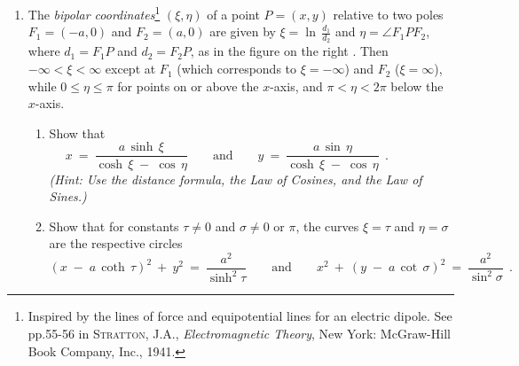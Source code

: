 {\begin{enumerate}[\bfseries 1.]
\[\]
[{[\bfseries 1.]}]
 \item The \emph{bipolar coordinates}\footnote{Inspired by the lines of force
  and equipotential lines for an electric dipole. See pp.55-56 in
 \textsc{Stratton, J.A.}, \emph{Electromagnetic Theory}, New York: McGraw-Hill
 Book Company, Inc., 1941.} $(\xi,\eta)$ of a point $P=(x,y)$ relative to
 two poles $F_1=(-a,0)$ and $F_2=(a,0)$ are given by
 $\xi = \ln\,\frac{d_1}{d_2}$ and $\eta =\angle F_1PF_2$, where $d_1=F_1P$ and
 $d_2=F_2P$, as in the figure on the right . Then
 $-\infty < \xi < \infty$ except at $F_1$ (which corresponds to
 $\xi=-\infty$) and $F_2$ ($\xi=\infty$), while $0 \le \eta \le \pi$ for points
 on or above the $x$-axis, and $\pi < \eta < 2\pi$ below the  $x$-axis.
\begin{enumerate}[\bfseries (a)]
 \item Show that
\[
x ~=~ \frac{a\,\sinh\,\xi}{\cosh\,\xi \;-\; \cos\,\eta} \qquad\text{and}\qquad
y ~=~ \frac{a\,\sin\,\eta}{\cosh\,\xi \;-\; \cos\,\eta} ~~.\qquad\qquad
\]
\emph{(Hint: Use the distance formula, the Law of Cosines, and the Law of 
Sines.)}
 \item Show that for constants $\tau \ne 0$ and $\sigma \ne 0$ or $\pi$, the
  curves $\xi = \tau$ and $\eta = \sigma$ are the respective circles
\[
(x \;-\; a\,\coth\,\tau)^2 ~+~ y^2 ~=~ \frac{a^2}{\sinh^2 \tau} \qquad\text{and}\qquad
x^2 ~+~ (y \;-\; a\,\cot\,\sigma)^2 ~=~ \frac{a^2}{\sin^2 \sigma} ~~.
\]
\end{enumerate}
\end{enumerate}
}
